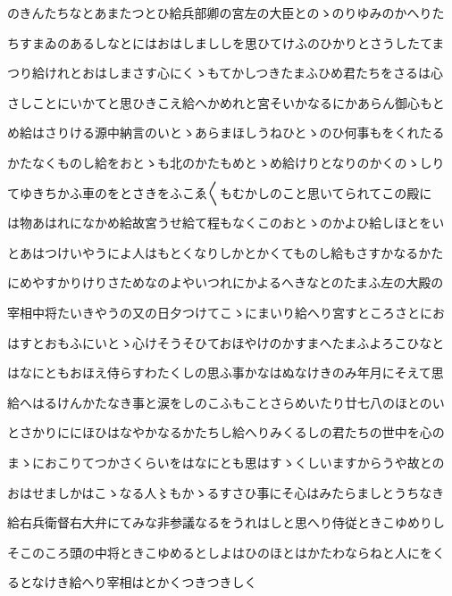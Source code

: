\documentclass[a4paper,11pt,landscape]{ltjtarticle}
\begin{document}
のきんたちなとあまたつとひ給兵部卿の宮左の大臣とのゝのりゆみのかへりた
\par\medskip
ちすまゐのあるしなとにはおはしまししを思ひてけふのひかりとさうしたてま
\par\medskip
つり給けれとおはしまさす心にくゝもてかしつきたまふひめ君たちをさるは心
\par\medskip
さしことにいかてと思ひきこえ給へかめれと宮そいかなるにかあらん御心もと
\par\medskip
め給はさりける源中納言のいとゝあらまほしうねひとゝのひ何事もをくれたる
\par\medskip
かたなくものし給をおとゝも北のかたもめとゝめ給けりとなりのかくのゝしり
\par\medskip
てゆきちかふ車のをとさきをふこゑ〱もむかしのこと思いてられてこの殿に
\par\medskip
は物あはれになかめ給故宮うせ給て程もなくこのおとゝのかよひ給しほとをい
\par\medskip
とあはつけいやうによ人はもとくなりしかとかくてものし給もさすかなるかた
\par\medskip
にめやすかりけりさためなのよやいつれにかよるへきなとのたまふ左の大殿の
\par\medskip
宰相中将たいきやうの又の日夕つけてこゝにまいり給へり宮すところさとにお
\par\medskip
はすとおもふにいとゝ心けそうそひておほやけのかすまへたまふよろこひなと
\par\medskip
はなにともおほえ侍らすわたくしの思ふ事かなはぬなけきのみ年月にそえて思
\par\medskip
給へはるけんかたなき事と涙をしのこふもことさらめいたり廿七八のほとのい
\par\medskip
とさかりににほひはなやかなるかたちし給へりみくるしの君たちの世中を心の
\par\medskip
まゝにおこりてつかさくらいをはなにとも思はすゝくしいますからうや故との
\par\medskip
おはせましかはこゝなる人〻もかゝるすさひ事にそ心はみたらましとうちなき
\par\medskip
給右兵衛督右大弁にてみな非参議なるをうれはしと思へり侍従ときこゆめりし
\par\medskip
そこのころ頭の中将ときこゆめるとしよはひのほとはかたわならねと人にをく
\par\medskip
るとなけき給へり宰相はとかくつきつきしく
\par\medskip
\end{document}
